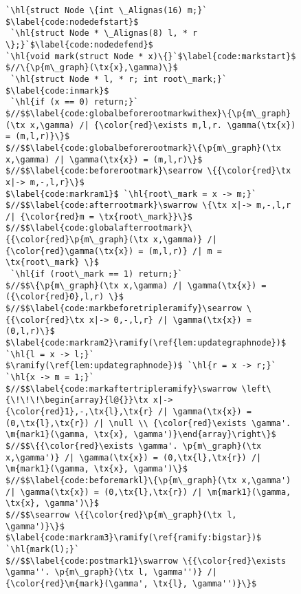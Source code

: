 \renewcommand{\tx}[1]{\scriptsize {\text{#1}}}


\begin{figure}[t]
  \begin{lstlisting}[multicols=2]
`\hl{struct Node \{int \_Alignas(16) m;}` $\label{code:nodedefstart}$
 `\hl{struct Node * \_Alignas(8) l, * r \};}`$\label{code:nodedefend}$
`\hl{void mark(struct Node * x)\{}`$\label{code:markstart}$
$//\{\p{m\_graph}(\tx{x},\gamma)\}$
 `\hl{struct Node * l, * r; int root\_mark;}` $\label{code:inmark}$
 `\hl{if (x == 0) return;}`
$//$$\label{code:globalbeforerootmarkwithex}\{\p{m\_graph}(\tx x,\gamma) /| {\color{red}\exists m,l,r. \gamma(\tx{x}) = (m,l,r)}\}$
$//$$\label{code:globalbeforerootmark}\{\p{m\_graph}(\tx x,\gamma) /| \gamma(\tx{x}) = (m,l,r)\}$
$//$$\label{code:beforerootmark}\searrow \{{\color{red}\tx x|-> m,-,l,r}\}$
$\label{code:markram1}$ `\hl{root\_mark = x -> m;}`
$//$$\label{code:afterrootmark}\swarrow \{\tx x|-> m,-,l,r /| {\color{red}m = \tx{root\_mark}}\}$
$//$$\label{code:globalafterrootmark}\{{\color{red}\p{m\_graph}(\tx x,\gamma)} /| {\color{red}\gamma(\tx{x}) = (m,l,r)} /| m = \tx{root\_mark} \}$
 `\hl{if (root\_mark == 1) return;}`
$//$$\{\p{m\_graph}(\tx x,\gamma) /| \gamma(\tx{x}) = ({\color{red}0},l,r) \}$
$//$$\label{code:markbeforetripleramify}\searrow \{{\color{red}\tx x|-> 0,-,l,r} /| \gamma(\tx{x}) = (0,l,r)\}$
$\label{code:markram2}\ramify(\ref{lem:updategraphnode})$ `\hl{l = x -> l;}`
$\ramify(\ref{lem:updategraphnode})$ `\hl{r = x -> r;}` 
`\hl{x -> m = 1;}`
$//$$\label{code:markaftertripleramify}\swarrow \left\{\!\!\!\begin{array}{l@{}}\tx x|-> {\color{red}1},-,\tx{l},\tx{r} /| \gamma(\tx{x}) = (0,\tx{l},\tx{r}) /| \null \\ {\color{red}\exists \gamma'. \m{mark1}(\gamma, \tx{x}, \gamma')}\end{array}\right\}$
$//$$\{{\color{red}\exists \gamma'. \p{m\_graph}(\tx x,\gamma')} /| \gamma(\tx{x}) = (0,\tx{l},\tx{r}) /| \m{mark1}(\gamma, \tx{x}, \gamma')\}$
$//$$\label{code:beforemarkl}\{\p{m\_graph}(\tx x,\gamma') /| \gamma(\tx{x}) = (0,\tx{l},\tx{r}) /| \m{mark1}(\gamma, \tx{x}, \gamma')\}$
$//$$\searrow \{{\color{red}\p{m\_graph}(\tx l, \gamma')}\}$
$\label{code:markram3}\ramify(\ref{ramify:bigstar})$ `\hl{mark(l);}`
$//$$\label{code:postmark1}\swarrow \{{\color{red}\exists \gamma''. \p{m\_graph}(\tx l, \gamma'')} /| {\color{red}\m{mark}(\gamma', \tx{l}, \gamma'')}\}$

\end{lstlisting}
\end{figure}
